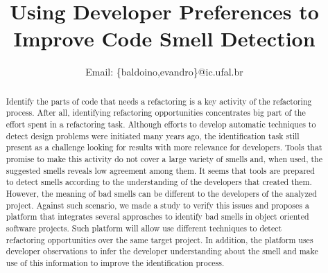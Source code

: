 \documentclass[conference]{IEEEtran}
\begin{document}
%
\title{Using Developer Preferences to Improve Code Smell Detection}


\author{
\and
{}
\and
{}
Email: \{baldoino,evandro\}@ic.ufal.br}

\maketitle


\begin{abstract}

Identify the parts of code that needs a refactoring is a key activity of the refactoring process. After all, identifying refactoring opportunities concentrates big part of the effort spent in a refactoring task. Although efforts to develop automatic techniques to detect design problems were initiated many years ago, the identification task still present as a challenge looking for results with more relevance for developers. Tools that promise to make this activity do not cover a large variety of smells and, when used, the suggested smells reveals low agreement among them. It seems that tools are prepared to detect smells according to the understanding of the developers that created them. However, the meaning of bad smells can be different to the developers of the analyzed project. Against such scenario, we made a study to verify this issues and proposes a platform that integrates several approaches to 
identify bad smells in object oriented software projects. Such platform will allow use different techniques to detect refactoring opportunities over the same target project. In addition, the platform uses developer observations to infer the developer understanding about the smell and make use of this information to improve the identification process.

\end{abstract}
\end{document}

